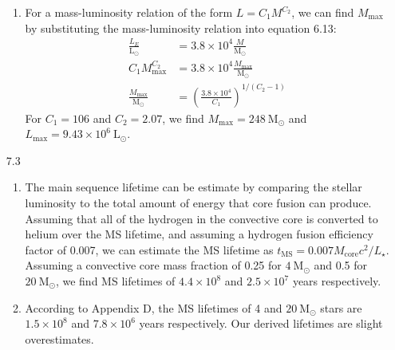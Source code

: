 \documentclass[11pt]{article}
\newcommand\lsol{\mathrm{L}_\odot}
\newcommand\msol{\mathrm{M}_\odot}
\begin{document}
\begin{enumerate}
\begin{enumerate}
    \item For a mass-luminosity relation of the form $L = C_1M^{C_2}$, we can find $M_\mathrm{max}$ by substituting the mass-luminosity relation into equation 6.13:
    \begin{align}
    \frac{L_E}{\lsol} &= 3.8 \times 10^4 \frac{M}{\msol} \\
    C_1M_\mathrm{max}^{C_2} &= 3.8 \times 10^4 \frac{M_\mathrm{max}}{\msol} \\
    \frac{M_\mathrm{max}}{\msol} &= \left( \frac{3.8 \times 10^4}{C_1} \right)^{1/(C_2-1)}
    \end{align}
    For $C_1 = 106$ and $C_2 = 2.07$, we find $M_\mathrm{max} = 248~\msol$ and $L_\mathrm{max} = 9.43\times10^6~\lsol$.
    
    \end{enumerate}

\item [7.3]
	\begin{enumerate}
    \item The main sequence lifetime can be estimate by comparing the stellar luminosity to the total amount of energy that core fusion can produce. Assuming that all of the hydrogen in the convective core is converted to helium over the MS lifetime, and assuming a hydrogen fusion efficiency factor of 0.007, we can estimate the MS lifetime as $t_\mathrm{MS} = 0.007 M_\mathrm{core} c^2 / L_\star$. Assuming a convective core mass fraction of 0.25 for $4~\msol$ and 0.5 for $20~\msol$, we find MS lifetimes of $4.4 \times 10^{8}$ and $2.5 \times 10^{7}$ years respectively.
    
    \item According to Appendix D, the MS lifetimes of 4 and $20~\msol$ stars are $1.5 \times 10^8$ and $7.8 \times 10^6$ years respectively. Our derived lifetimes are slight overestimates.
    \end{enumerate}


\end{enumerate}
\end{document}
